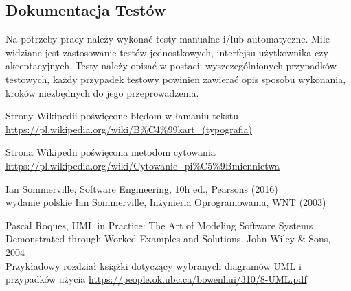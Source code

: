 \documentclass[12pt,a4paper]{article}
\begin{document}
\subsection{Dokumentacja Testów}

Na potrzeby pracy należy wykonać testy manualne i/lub automatyczne. Mile widziane jest zastosowanie testów jednostkowych, interfejsu użytkownika czy akceptacyjnych. Testy należy opisać w postaci: wyszczególnionych przypadków testowych, każdy przypadek testowy powinien zawierać opis sposobu wykonania, kroków niezbędnych do jego przeprowadzenia.






 Strony Wikipedii poświęcone błędom w łamaniu tekstu\\
\url{https://pl.wikipedia.org/wiki/B%C4%99kart_(typografia)}

 Strona Wikipedii poświęcona metodom cytowania \\
\url{https://pl.wikipedia.org/wiki/Cytowanie_pi%C5%9Bmiennictwa}

 Ian Sommerville, Software Engineering, 10h ed., Pearsons  (2016)\\
 wydanie polskie Ian Sommerville, Inżynieria Oprogramowania, WNT (2003)

 Pascal Roques, UML in Practice: The Art of Modeling Software Systems Demonstrated through Worked Examples and Solutions, John Wiley \& Sons, 2004\\
    Przykładowy rozdział książki dotyczący wybranych diagramów UML i przypadków użycia \url{https://people.ok.ubc.ca/bowenhui/310/8-UML.pdf}
\end{document}
